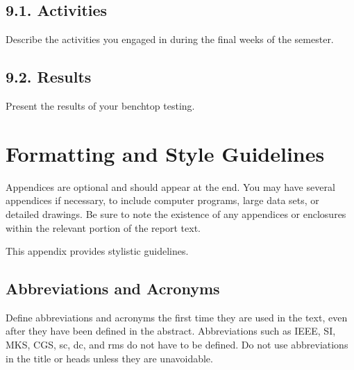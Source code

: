 \documentclass[10pt]{article}
\begin{document}
\subsection{9.1. Activities}
Describe the activities you engaged in during the final weeks of the semester.

\subsection{9.2. Results}
Present the results of your benchtop testing. 


\appendix
\section{Formatting and Style Guidelines}
Appendices are optional and should appear at the end. You may have several appendices if necessary, to include computer programs, large data sets, or detailed drawings. Be sure to note the existence of any appendices or enclosures within the relevant portion of the report text.  

This appendix provides stylistic guidelines. %

\subsection{Abbreviations and Acronyms}
Define abbreviations and acronyms the first time they are used in the text, even after they have been defined in the abstract. Abbreviations such as IEEE, SI, MKS, CGS, sc, dc, and rms do not have to be defined. Do not use abbreviations in the title or heads unless they are unavoidable.
\end{document}
